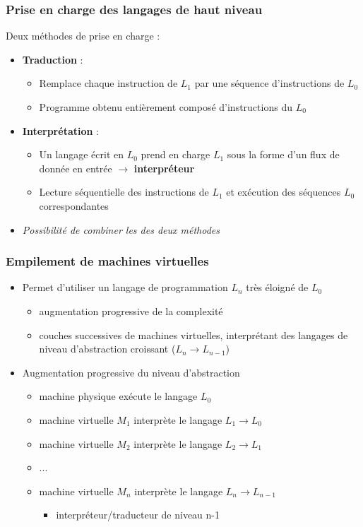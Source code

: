 \begin{frame}
\frametitle{Prise en charge des langages de haut niveau}
Deux méthodes de prise en charge :
\begin{itemize}
\item \textbf{Traduction} :
\begin{itemize}
\item Remplace chaque instruction de $L_1$ par une séquence d'instructions de $L_0$
\item Programme obtenu entièrement composé d'instructions du $L_0$
\end{itemize}

\item \textbf{Interprétation} :
\begin{itemize}
\item Un langage écrit en $L_0$ prend en charge $L_1$ sous la forme d'un flux de donnée en entrée $\rightarrow$ \textbf{interpréteur}
\item Lecture séquentielle des instructions de $L_1$ et exécution des séquences $L_0$ correspondantes
\end{itemize}
\item \textit{Possibilité de combiner les des deux méthodes} \cite{tanen}
\end{itemize}
\end{frame}

\begin{frame}
\frametitle{Empilement de machines virtuelles}
\begin{itemize}
\item Permet d'utiliser un langage de programmation $L_n$ très éloigné de $L_0$
\begin{itemize}
\item augmentation progressive de la complexité
\item couches successives de machines virtuelles, interprétant des langages de niveau d'abstraction croissant ($L_n \rightarrow L_{n-1}$)
\end{itemize}

\item Augmentation progressive du niveau d'abstraction
\begin{itemize}
\item machine physique exécute le langage $L_0$
\item machine virtuelle $M_1$ interprète le langage $L_1 \rightarrow L_0$
\item machine virtuelle $M_2$ interprète le langage $L_2 \rightarrow L_1$
\item ...
\item machine virtuelle $M_n$ interprète le langage $L_n \rightarrow L_{n-1}$
\begin{itemize}
\item interpréteur/traducteur de niveau n-1
\end{itemize}
\end{itemize}
\end{itemize}
\end{frame}

